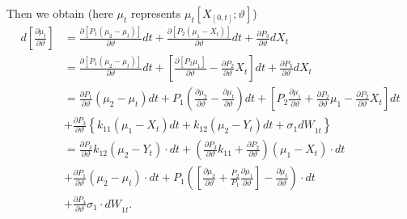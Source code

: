 \documentclass[11pt]{article}%
\theoremstyle{definition}
\begin{document}
Then we obtain (here $\mu_{t}$ represents $\mu_{t}[X_{[0,t]};\vartheta]$)
\begin{align*}
d\left[  \frac{\partial\mu_{t}}{\partial\vartheta}\right]   &  =\frac
{\partial\left[  P_{1}\left(  \mu_{2}-\mu_{t}\right)  \right]  }%
{\partial\vartheta}dt+\frac{\partial\left[  P_{2}\left(  \mu_{1}-X_{t}\right)
\right]  }{\partial\vartheta}dt+\frac{\partial P_{3}}{\partial\vartheta}%
dX_{t}\\
&  =\frac{\partial\left[  P_{1}\left(  \mu_{2}-\mu_{t}\right)  \right]
}{\partial\vartheta}dt+\left[  \frac{\partial\left[  P_{2}\mu_{1}\right]
}{\partial\vartheta}-\frac{\partial P_{2}}{\partial\vartheta}X_{t}\right]
dt+\frac{\partial P_{3}}{\partial\vartheta}dX_{t}\\
&  =\frac{\partial P_{1}}{\partial\vartheta}\left(  \mu_{2}-\mu_{t}\right)
dt+P_{1}\left(  \frac{\partial\mu_{2}}{\partial\vartheta}-\frac{\partial
\mu_{t}}{\partial\vartheta}\right)  dt+\left[  P_{2}\frac{\partial\mu_{1}%
}{\partial\vartheta}+\frac{\partial P_{2}}{\partial\vartheta}\mu_{1}%
-\frac{\partial P_{2}}{\partial\vartheta}X_{t}\right]  dt\\
&  +\frac{\partial P_{3}}{\partial\vartheta}\left\{  {k_{11}}\left(  \mu
_{1}-X_{t}\right)  dt+{k_{12}}\left(  \mu_{2}-Y_{t}\right)  dt+{\sigma_{1}%
dW}_{1t}\right\} \\
&  =\frac{\partial P_{3}}{\partial\vartheta}{k_{12}}\left(  \mu_{2}%
-Y_{t}\right)  \cdot dt+\left(  \frac{\partial P_{3}}{\partial\vartheta
}{k_{11}+}\frac{\partial P_{2}}{\partial\vartheta}\right)  \left(  \mu
_{1}-X_{t}\right)  \cdot dt\\
&  +\frac{\partial P_{1}}{\partial\vartheta}\left(  \mu_{2}-\mu_{t}\right)
\cdot dt+P_{1}\left(  \left[  \frac{\partial\mu_{2}}{\partial\vartheta}%
+\frac{P_{2}}{P_{1}}\frac{\partial\mu_{1}}{\partial\vartheta}\right]
-\frac{\partial\mu_{t}}{\partial\vartheta}\right)  \cdot dt\\
&  +\frac{\partial P_{3}}{\partial\vartheta}{\sigma_{1}\cdot dW}_{1t}.
\end{align*}
\end{document}
